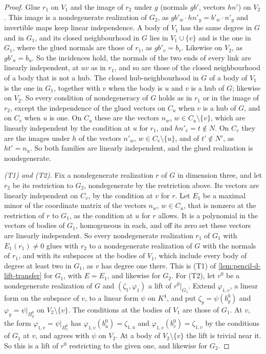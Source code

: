 \begin{proof}
  Glue $r_1$ on $V_1$ and the image of $r_2$ under $g$ (normals $g b'$,
  vectors $h n'$) on $V_2$. This image is a nondegenerate realization of
  $G_2$, as $g b'_w \cdot h n'_y = b'_w \cdot n'_y$ and invertible maps
  keep linear independence. A body of $V_1$ has the same degree in $G$
  and in $G_1$, and its closed neighbourhood in $G$ lies in
  $V_1 \cup \{v\}$ and is the one in $G_1$, where the glued normals are
  those of $r_1$, as $g b'_v = b_v$. Likewise on $V_2$, as $g b'_u = b_u$.
  So the incidences hold, the normals of the two ends of every link are
  linearly independent, at $uv$ as in $r_1$, and so are those of the
  closed neighbourhood of a body that is not a hub. The closed
  hub-neighbourhood in $G$ of a body of $V_1$ is the one in $G_1$,
  together with $v$ when the body is $u$ and $v$ is a hub of $G$; likewise
  on $V_2$. So every condition of nondegeneracy of $G$ holds as in $r_1$
  or in the image of $r_2$, except the independence of the glued vectors
  on $C_u$ when $v$ is a hub of $G$, and on $C_v$ when $u$ is one. On
  $C_u$ these are the vectors $n_w$, $w \in C_u \setminus \{v\}$, which
  are linearly independent by the condition at $u$ for $r_1$, and
  $h n'_v = t \notin N$. On $C_v$ they are the images under $h$ of the
  vectors $n'_w$, $w \in C_v \setminus \{u\}$, and of $t' \notin N'$, as
  $h t' = n_u$. So both families are linearly independent, and the glued
  realization is nondegenerate.

  \emph{(T1) and (T2).} Fix a nondegenerate realization $r$ of $G$ in
  dimension three, and let $r_2$ be its restriction to $G_2$,
  nondegenerate by the restriction above. Its vectors are linearly
  independent on $C_v$, by the condition at $v$ for $r$. Let $E_1$ be a
  maximal minor of the coordinate matrix of the vectors $n_w$,
  $w \in C_u$, that is nonzero at the restriction of $r$ to $G_1$, as the
  condition at $u$ for $r$ allows. It is a polynomial in the vectors of
  bodies of $G_1$, homogeneous in each, and off its zero set these
  vectors are linearly independent. So every nondegenerate realization
  $r_1$ of $G_1$ with $E_1(r_1) \ne 0$ glues with $r_2$ to a nondegenerate
  realization of $G$ with the normals of $r_1$, and with its subspaces at
  the bodies of $V_1$, which include every body of degree at least two in
  $G_1$, as $v$ has degree one there. This is (T1) of
  \cref{lem:pencil-d-lift-transfer} for $G_1$, with $E = E_1$, and
  likewise for $G_2$.
  For (T2), let $r^0$ be a nondegenerate realization of $G$ and
  $(\zeta_1, \varphi_1)$ a lift of $r^0|_{G_1}$. Extend
  $\varphi_{1,v}$, a linear form on the subspace of $v$, to a linear form
  $\psi$ on $K^4$, and put $\zeta_y = \psi(b^0_y)$ and
  $\varphi_y = \psi|_{\Pi^0_y}$ on $V_2 \setminus \{v\}$. The conditions
  at the bodies of $V_1$ are those of $G_1$. At $v$, the form
  $\varphi_{1,v} = \psi|_{\Pi^0_v}$ has $\varphi_{1,v}(b^0_u) =
  \zeta_{1,u}$ and $\varphi_{1,v}(b^0_v) = \zeta_{1,v}$ by the conditions
  of $G_1$ at $v$, and agrees with $\psi$ on $V_2$. At a body of
  $V_2 \setminus \{v\}$ the lift is trivial near it. So this is a lift of
  $r^0$ restricting to the given one, and likewise for $G_2$.


\end{proof}

